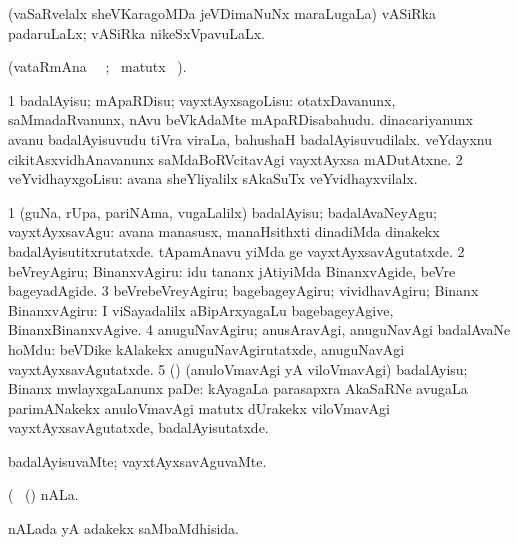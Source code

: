 \bentry
{} 
\gl{\gu}
\expl{}
\bmng
 (vaSaRvelalx sheVKaragoMDa jeVDimaNuNx maraLugaLa) vASiRka padaruLaLx; vASiRka nikeSxVpavuLaLx. 
\emng
\eentry

\bentry
{} 
\gl{\kirx}(vataRmAna \parxpu\ \Eva\ ; \BU\ matutx 
\BUkaq\ ). \bmng
\emng

\noindent
\gl{\sakirx}
\bmng
\bnum
\num{1} badalAyisu; mApaRDisu; vayxtAyxsagoLisu:  otatxDavanunx, saMmadaRvanunx, nAvu beVkAdaMte mApaRDisabahudu.  dinacariyanunx avanu badalAyisuvudu tiVra viraLa, bahushaH badalAyisuvudilalx.  veYdayxnu cikitAsxvidhAnavanunx saMdaBoRVcitavAgi vayxtAyxsa mADutAtxne. 
\num{2} veYvidhayxgoLisu:  avana sheYliyalilx sAkaSuTx veYvidhayxvilalx. 
\enum
\emng

\noindent
\gl{\akirx}
\expl{}
\bmng
\bnum
\num{1} (guNa, rUpa, pariNAma, \mo vugaLalilx) badalAyisu; badalAvaNeyAgu; vayxtAyxsavAgu:  avana manasusx, manaHsithxti dinadiMda dinakekx badalAyisutitxrutatxde.     tApamAnavu  yiMda  ge vayxtAyxsavAgutatxde. 
\num{2} beVreyAgiru; BinanxvAgiru:  idu tananx jAtiyiMda BinanxvAgide, beVre bageyadAgide. 
\num{3} beVrebeVreyAgiru; bagebageyAgiru; vividhavAgiru; Binanx BinanxvAgiru:  I viSayadalilx aBipArxyagaLu bagebageyAgive, BinanxBinanxvAgive. 
\num{4} anuguNavAgiru; anusAravAgi, anuguNavAgi badalAvaNe hoMdu:  beVDike kAlakekx anuguNavAgirutatxde, anuguNavAgi vayxtAyxsavAgutatxde. 
\num{5} (\ga) (anuloVmavAgi yA viloVmavAgi) badalAyisu; Binanx mwlayxgaLanunx paDe:  kAyagaLa parasapxra AkaSaRNe avugaLa parimANakekx anuloVmavAgi matutx dUrakekx viloVmavAgi vayxtAyxsavAgutatxde, badalAyisutatxde. 
\enum
\emng
\eentry

\bentry
{} 
\gl{\kirxvi}
\expl{}
\bmng
 badalAyisuvaMte; vayxtAyxsavAguvaMte. 
\emng
\eentry

\bentry
{} 
\gl{\nA}(\bava\ 
\bmng
(\aMrashA) nALa. 
\emng
\eentry

\bentry
{} 
\gl{\gu}
\expl{}
\bmng
nALada yA adakekx saMbaMdhisida. 
\emng
\eentry

